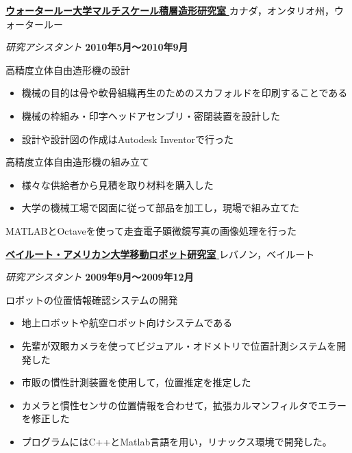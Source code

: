 \documentclass[10pt, a4paper]{article}
\def\xeCJKembold{0.15}
\def\saveCJKnode{\dimen255\lastkern}
\def\restoreCJKnode{\kern-\dimen255\kern\dimen255}
\let\CJKoldsymbol\CJKsymbol
\let\CJKoldpunctsymbol\CJKpunctsymbol
\def\CJKfakeboldsymbol#1{%
\special{pdf:literal direct 2 Tr \xeCJKembold\space w}%
\CJKoldsymbol{#1}%
\saveCJKnode
\special{pdf:literal direct 0 Tr}%
\restoreCJKnode}
\def\CJKfakeboldpunctsymbol#1{%
\special{pdf:literal direct 2 Tr \xeCJKembold\space w}%
\CJKoldpunctsymbol{#1}%
\saveCJKnode
\special{pdf:literal direct 0 Tr}%
\restoreCJKnode}
\newcommand\CJKfakebold[1]{%
\let\CJKsymbol\CJKfakeboldsymbol
\let\CJKpunctsymbol\CJKfakeboldpunctsymbol
#1%
\let\CJKsymbol\CJKoldsymbol
\let\CJKpunctsymbol\CJKoldpunctsymbol}
\begin{document}
\halfblankline

\href{http://rpl.uwaterloo.ca/}{\CJKfakebold{\textbf{ウォータールー大学マルチスケール積層造形研究室}}}\hfill カナダ，オンタリオ州，ウォータールー

\begin{outerlist}
\item[] \textit{研究アシスタント} \hfill \textbf{2010年5月〜2010年9月}
  \begin{innerlist}
  \item 高精度立体自由造形機の設計
    \begin{itemize}
      \item 機械の目的は骨や軟骨組織再生のためのスカフォルドを印刷することである
      \item 機械の枠組み・印字ヘッドアセンブリ・密閉装置を設計した
      \item 設計や設計図の作成はAutodesk Inventorで行った
    \end{itemize}
  \item 高精度立体自由造形機の組み立て
    \begin{itemize}
      \item 様々な供給者から見積を取り材料を購入した
      \item 大学の機械工場で図面に従って部品を加工し，現場で組み立てた
    \end{itemize}
  \item MATLABとOctaveを使って走査電子顕微鏡写真の画像処理を行った
  \end{innerlist}
\end{outerlist}

\halfblankline

\href{http://www.aub.edu.lb/fea/me/research_labs/cvl/Pages/home.aspx}{\CJKfakebold{\textbf{ベイルート・アメリカン大学移動ロボット研究室}}}\hfill レバノン，ベイルート

\begin{outerlist}
\item[] \textit{研究アシスタント} \hfill \textbf{2009年9月〜2009年12月}
  \begin{innerlist}
  \item ロボットの位置情報確認システムの開発
    \begin{itemize}
      \item 地上ロボットや航空ロボット向けシステムである
      \item 先輩が双眼カメラを使ってビジュアル・オドメトリで位置計測システムを開発した
      \item 市販の慣性計測装置を使用して，位置推定を推定した
      \item カメラと慣性センサの位置情報を合わせて，拡張カルマンフィルタでエラーを修正した
      \item プログラムにはC++とMatlab言語を用い，リナックス環境で開発した。
    \end{itemize}
  \end{innerlist}
\end{outerlist}
\end{document}
